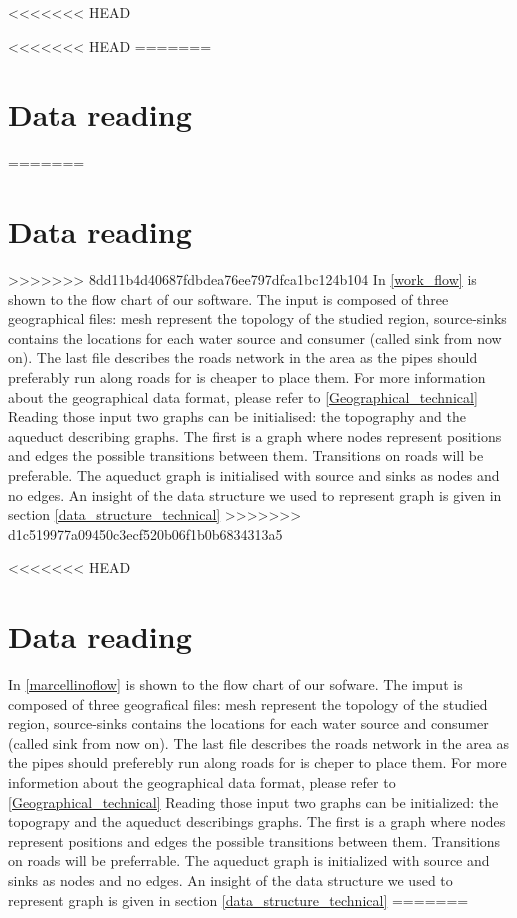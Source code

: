 <<<<<<< HEAD

<<<<<<< HEAD
=======
\section {Data reading}
=======


\section{Data reading}
>>>>>>> 8dd11b4d40687fdbdea76ee797dfca1bc124b104
In \ref {work_flow} is shown to the flow chart of our software. 
The input is composed of three geographical files: mesh represent the topology of the studied region, source-sinks contains the locations for each water source and consumer (called sink from now on). The last file describes the roads network in the area as the pipes should preferably run along roads for is cheaper to place them. For more information about the geographical data format, please refer to \ref{Geographical_technical}
Reading those input two graphs can be initialised: the topography and the aqueduct describing graphs. The first is a graph where nodes represent positions and edges the possible transitions between them. Transitions on roads will be preferable. The aqueduct graph is initialised with source and sinks as nodes and no edges. An insight of the data structure we used to represent graph is given in section \ref {data_structure_technical}
>>>>>>> d1c519977a09450c3ecf520b06f1b0b6834313a5

<<<<<<< HEAD
\section{Data reading}
In \ref{marcellinoflow} is shown to the flow chart of our sofware. 
The imput is composed of three geografical files: mesh represent the topology of the studied region, 
source-sinks contains the locations for each water source and consumer (called sink from now on). 
The last file describes the roads network in the area as the pipes should preferebly run along roads 
for is cheper to place them. For more informetion about the geographical data format, please refer to
 \ref{Geographical_technical} Reading those input two graphs can be initialized: the topograpy and the 
 aqueduct describings graphs. The first is a graph where nodes represent positions and edges the 
 possible transitions between them. Transitions on roads will be preferrable. The aqueduct graph is 
 initialized with source and sinks as nodes and no edges. An insight of the data structure we used to 
 represent graph is given in section \ref{data_structure_technical}
=======
